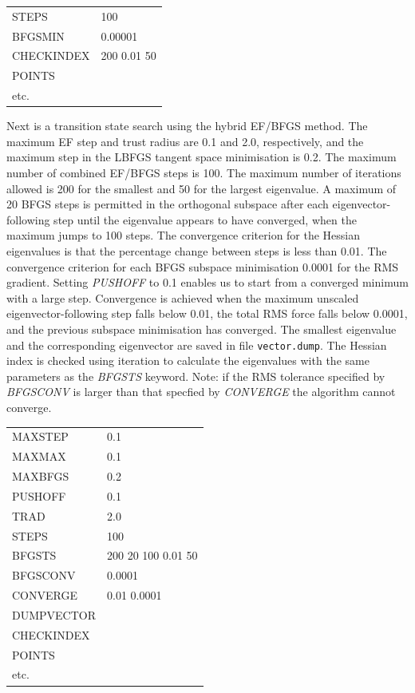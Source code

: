 \documentclass[12pt,a4paper,dvips]{article}
\begin{document}
\medskip
\begin{tabular}{ll}
 STEPS & 100 \\
 BFGSMIN & 0.00001 \\
 CHECKINDEX & 200 0.01 50 \\
 POINTS \\
 etc. \\
\end{tabular}
\medskip

\noindent Next is a transition state search using the hybrid EF/BFGS method. The maximum EF
step and trust radius are 0.1 and 2.0, respectively,
and the maximum step in the LBFGS tangent space minimisation is 0.2. The maximum number of combined
EF/BFGS steps is 100. The maximum number of iterations allowed is
200 for the smallest and 50 for the largest eigenvalue. A maximum of 20 BFGS steps 
is permitted in
the orthogonal subspace after each eigenvector-following step until the eigenvalue
appears to have converged, when the maximum jumps to 100 steps.
The convergence criterion
for the Hessian eigenvalues is that the percentage change between steps is
less than 0.01. The convergence criterion for each BFGS
subspace minimisation 0.0001 for the RMS gradient.
Setting {\it PUSHOFF\/} to 0.1 enables us to start from a converged minimum with
a large step.
Convergence is achieved when the maximum unscaled eigenvector-following step
falls below 0.01, the total RMS force falls below 0.0001, and the previous subspace
minimisation has converged. The smallest eigenvalue and the corresponding eigenvector
are saved in file {\tt vector.dump}. The Hessian index is checked using iteration to
calculate the eigenvalues with the same parameters as the {\it BFGSTS\/} keyword.
Note: if the RMS tolerance specified by {\it BFGSCONV\/} is larger than that specfied by
{\it CONVERGE \/} the algorithm cannot converge.

\medskip
\begin{tabular}{ll}
 MAXSTEP & 0.1 \\
 MAXMAX  & 0.1 \\
 MAXBFGS & 0.2 \\
 PUSHOFF & 0.1 \\
 TRAD & 2.0 \\
 STEPS & 100 \\
 BFGSTS & 200 20 100 0.01 50 \\
 BFGSCONV & 0.0001 \\
 CONVERGE & 0.01 0.0001 \\
 DUMPVECTOR \\
 CHECKINDEX \\
 POINTS \\
 etc. \\
\end{tabular}
\medskip
\end{document}
